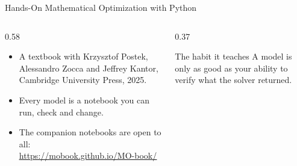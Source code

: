 \documentclass[aspectratio=169,11pt]{beamer}
\let\oldurl\url
\renewcommand{\url}[1]{{\color{linkblue}\uline{\oldurl{#1}}}}
\begin{document}
\begin{frame}{Hands-On Mathematical Optimization with Python}
\begin{columns}[T]
\begin{column}{0.58\textwidth}
\begin{itemize}
\item A textbook with Krzysztof Postek, Alessandro Zocca and Jeffrey Kantor, Cambridge University Press, 2025.
\item Every model is a notebook you can run, check and change.
\item The companion notebooks are open to all:\\ \url{https://mobook.github.io/MO-book/}
\end{itemize}
\end{column}
\begin{column}{0.37\textwidth}
\begin{block}{The habit it teaches}
A model is only as good as your ability to verify what the solver returned.
\end{block}
\end{column}
\end{columns}
\end{frame}
\end{document}

